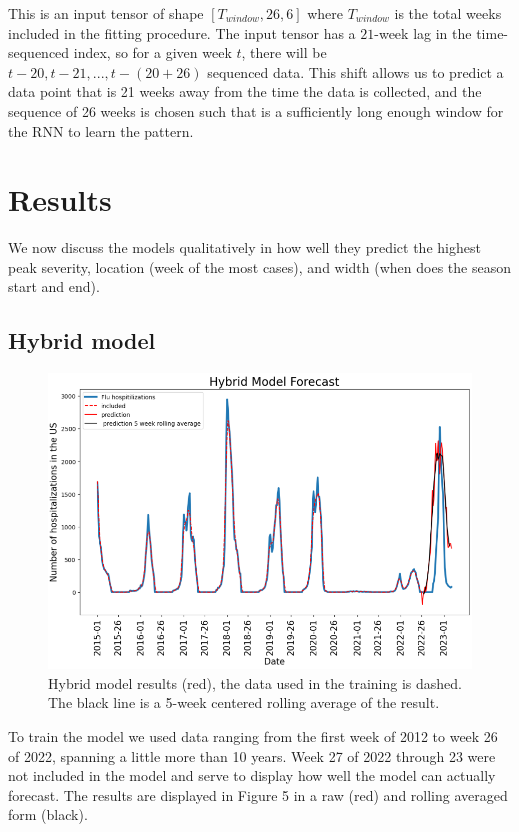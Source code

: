 \documentclass[12pt,a4paper,english]{article}
\begin{document}
This is an input tensor of shape $[T_{window},26,6]$ where $T_{window}$ is the total weeks included in the fitting procedure. The input tensor has a $21$-week lag in the time-sequenced index, so for a given week $t$, there will be $t-20,t-21,...,t-(20+26)$ sequenced data. This shift allows us to predict a data point that is 21 weeks away from the time the data is collected, and the sequence of 26 weeks is chosen such that is a sufficiently long enough window for the RNN to learn the pattern. 


	
\section{Results}
We now discuss the models qualitatively in how well they predict the highest peak severity, location (week of the most cases), and width (when does the season start and end).
\subsection{Hybrid model}

	\begin{figure}[h!]
		\begin{center}
		\includegraphics[scale=0.5]{Pictures/hy_model.png}
		\caption{Hybrid model results (red), the data used in the training is dashed. The black line is a 5-week centered rolling average of the result.}
		\end{center}
		\label{fig:hy_model}
	\end{figure}
\FloatBarrier

To train the model we used data ranging from the first week of 2012 to week 26 of 2022, spanning a little more than 10 years. Week 27 of 2022 through 23 were not included in the model and serve to display how well the model can actually forecast. The results are displayed in Figure 5 in a raw (red) and rolling averaged form (black). 
\end{document}
